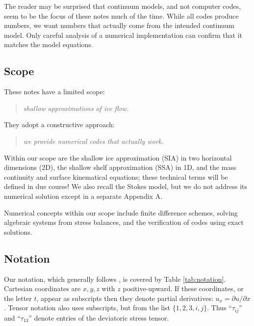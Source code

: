 \documentclass[letterpaper,final,12pt,reqno]{amsart}
\begin{document}
The reader may be surprised that continuum models, and not computer codes, seem to be the focus of these notes much of the time.  While all codes produce numbers, we want numbers that actually come from the intended continuum model.  Only careful analysis of a numerical implementation can confirm that it matches the model equations.

\subsection*{Scope}  These notes have a limited scope:
  \begin{quote}\emph{shallow approximations of ice flow.}\end{quote}
They adopt a constructive approach:
  \begin{quote}\emph{we provide numerical codes that actually work.}\end{quote}
Within our scope are the shallow ice approximation (SIA) in two horizontal dimensions (2D), the shallow shelf approximation (SSA) in 1D, and the mass continuity and surface kinematical equations; these technical terms will be defined in due course!  We also recall the Stokes model, but we do not address its numerical solution except in a separate Appendix A.

Numerical concepts within our scope include finite difference schemes, solving algebraic systems from stress balances, and the verification of codes using exact solutions.

\subsection*{Notation}  Our notation, which generally follows \cite{GreveBlatter2009}, is covered by Table \ref{tab:notation}.  Cartesian coordinates are $x,y,z$ with $z$ positive-upward.  If these coordinates, or the letter $t$, appear as subscripts then they denote partial derivatives: $u_x = \partial u/\partial x$.  Tensor notation also uses subscripts, but from the list $\{1,2,3,i,j\}$.  Thus ``$\tau_{ij}$'' and ``$\tau_{13}$'' denote entries of the deviatoric stress tensor.
\end{document}
